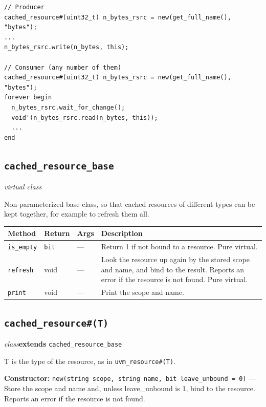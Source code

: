 \documentclass[11pt,letterpaper]{report}
\begin{document}
\begin{verbatim}
// Producer
cached_resource#(uint32_t) n_bytes_rsrc = new(get_full_name(), "bytes");
...
n_bytes_rsrc.write(n_bytes, this);

// Consumer (any number of them)
cached_resource#(uint32_t) n_bytes_rsrc = new(get_full_name(), "bytes");
forever begin
  n_bytes_rsrc.wait_for_change();
  void'(n_bytes_rsrc.read(n_bytes, this));
  ...
end
\end{verbatim}

\subsection*{\texttt{cached\_resource\_base}}
\noindent\small\textit{virtual class}\par

Non-parameterized base class, so that cached resources of different types can be kept together, for example to refresh them all.

\begin{xltabular}{\linewidth}{>{\small}p{1.35in} >{\small}p{1.25in} >{\small}p{0.95in} >{\small}X}
\toprule
\textbf{Method} & \textbf{Return} & \textbf{Args} & \textbf{Description} \\
\midrule
\endhead
\bottomrule
\endfoot
\texttt{is\_empty} & \texttt{bit} & --- & Return 1 if not bound to a resource. Pure virtual. \\
\texttt{refresh} & void & --- & Look the resource up again by the stored scope and name, and bind to the result. Reports an error if the resource is not found. Pure virtual. \\
\texttt{print} & void & --- & Print the scope and name. \\
\end{xltabular}

\subsection*{\texttt{cached\_resource\#(T)}}
\noindent\small\textit{class}\quad \textbf{extends} \texttt{cached\_resource\_base}\par

T is the type of the resource, as in \texttt{uvm\_resource\#(T)}.

\noindent\textbf{Constructor:} \texttt{new(string scope, string name, bit leave\_unbound = 0)} --- Store the scope and name and, unless leave\_unbound is 1, bind to the resource. Reports an error if the resource is not found.
\end{document}
